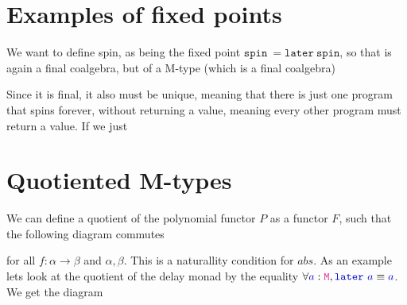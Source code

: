 \documentclass[twoside,11pt,openright]{report}
\newcommand*{\term}[1]{\textcolor{blue!80!black}{#1}}
\newcommand*{\type}[1]{\textcolor{magenta!90!black}{#1}}
\begin{document}
\section{Examples of fixed points}
We want to define spin, as being the fixed point \(\mathtt{spin}\ = \mathtt{later}~\mathtt{spin}\), so that is again a final coalgebra, but of a M-type (which is a final coalgebra)

\begin{figure}[h]
  \centering
\end{figure}
\noindent Since it is final, it also must be unique, meaning that there is just one program that spins forever, without returning a value, meaning every other program must return a value. If we just

\section{Quotiented M-types}
We can define a quotient of the polynomial functor \(P\) as a functor \(F\), such that the following diagram commutes

\begin{figure}[h]
  \centering
\end{figure}
\noindent for all \(f : \alpha \rightarrow \beta\) and \(\alpha,\beta\). This is a naturallity condition for \(abs\). As an example lets look at the quotient of the delay monad by the equality \(\forall \term{a} : \type{\mathtt{M}} , \term{\mathtt{later}}~\term{a} \equiv \term{a}\). We get the diagram
\end{document}

